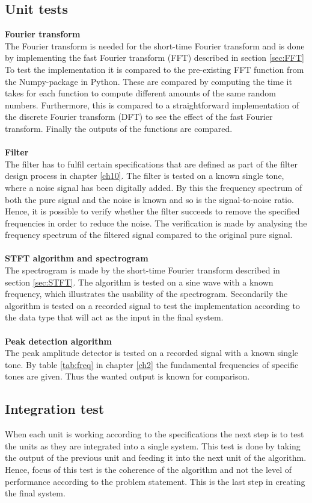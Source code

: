 \subsection{Unit tests} 
\textbf{Fourier transform} \\
The Fourier transform is needed for the short-time Fourier transform and is done by implementing the fast Fourier transform (FFT) described in section \ref{sec:FFT} 
To test the implementation it is compared to the pre-existing FFT function from the Numpy-package in Python. These are compared by computing the time it takes for each function to compute different amounts of the same random numbers. Furthermore, this is compared to a straightforward implementation of the discrete Fourier transform (DFT) to see the effect of the fast Fourier transform. Finally the outputs of the functions are compared.
\\
\\
\textbf{Filter}\\
The filter has to fulfil certain specifications that are defined as part of the filter design process in chapter \ref{ch10}. The filter is tested on a known single tone, where a noise signal has been digitally added. By this the frequency spectrum of both the pure signal and the noise is known and so is the signal-to-noise ratio. Hence, it is possible to verify whether the filter succeeds to remove the specified frequencies in order to reduce the noise. The verification is made by analysing the frequency spectrum of the filtered signal compared to the original pure signal. \\
\\
\textbf{STFT algorithm and spectrogram}\\
The spectrogram is made by the short-time Fourier transform described in section \ref{sec:STFT}. The algorithm is tested on a sine wave with a known frequency, which illustrates the usability of the spectrogram. Secondarily the algorithm is tested on a recorded signal to test the implementation according to the data type that will act as the input in the final system.
\\ \\
\textbf{Peak detection algorithm}\\
The peak amplitude detector is tested on a recorded signal with a known single tone. By table \ref{tab:freq} in chapter \ref{ch2} the fundamental frequencies of specific tones are given. Thus the wanted output is known for comparison.         

\subsection{Integration test}
When each unit is working according to the specifications the next step is to test the units as they are integrated into a single system. This test is done by taking the output of the previous unit and feeding it into the next unit of the algorithm. Hence, focus of this test is the coherence of the algorithm and not the level of performance according to the problem statement. This is the last step in creating the final system.

